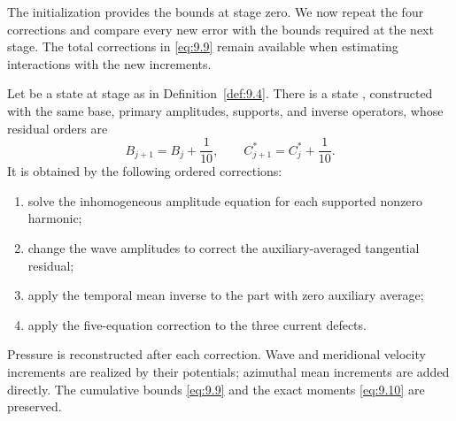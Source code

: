The initialization provides the bounds at stage zero. We now repeat the four corrections and compare
every new error with the bounds required at the next stage. The total corrections in \eqref{eq:9.9}
remain available when estimating interactions with the new increments.

\begin{proposition}\label{prop:9.6}
Let  be a state at stage
 as in Definition~\ref{def:9.4}. There is a state
, constructed with the same base, primary amplitudes,
supports, and inverse operators, whose residual orders are
\[
B_{j+1}=B_j+\frac1{10},
\qquad
C_{j+1}^*=C_j^*+\frac1{10}.
\]
It is obtained by the following ordered corrections:
\begin{enumerate}[label=(\roman*)]
%
\item solve the inhomogeneous amplitude equation for each supported nonzero harmonic;
\item change the wave amplitudes to correct the auxiliary-averaged tangential residual;
\item apply the temporal mean inverse to the part with zero auxiliary average;
\item apply the five-equation correction to the three current defects.
\end{enumerate}
Pressure is reconstructed after each correction. Wave and meridional velocity increments are
realized by their potentials; azimuthal mean increments are added directly. The cumulative bounds
\eqref{eq:9.9} and the exact moments \eqref{eq:9.10} are preserved.
\end{proposition}

